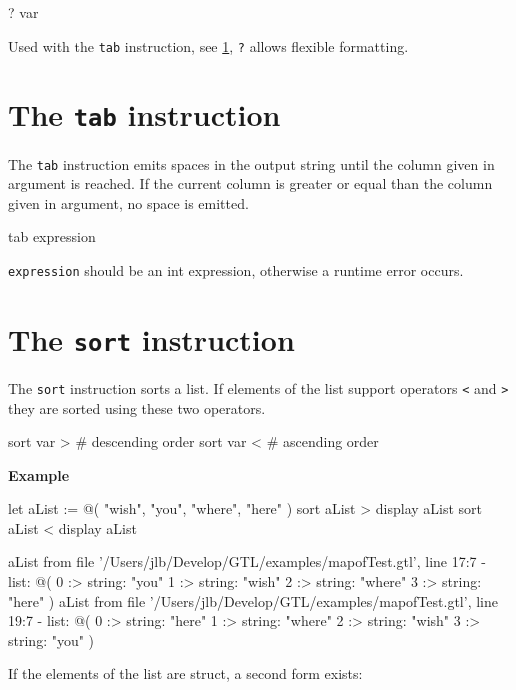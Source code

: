 \documentclass[10pt,openright,twosides]{report}
\newcommand{\gtltype}[1]{{\small\ttfamily #1}}
\newcommand{\gtlinline}[1]{\colorbox{light-blue}{\lstinline[language=gtl]{#1}}}
\newcommand{\example}{\vspace{.75em}\noindent\textbf{Example}\vspace{0em}}
\begin{document}
\begin{gtl}
? var
\end{gtl}

Used with the \gtlinline{tab} instruction, see \ref{sec:tab}, \gtlinline{?} allows flexible formatting.

\section{The \texttt{tab} instruction}
\label{sec:tab}

The \gtlinline{tab} instruction emits spaces in the output string until the column given in argument is reached. If the current column is greater or equal than the column given in argument, no space is emitted.

\begin{gtl}
tab expression
\end{gtl}

\gtlinline{expression} should be an \gtltype{int} expression, otherwise a runtime error occurs.

\section{The \texttt{sort} instruction}

The \gtlinline{sort} instruction sorts a \gtltype{list}. If elements of the list support operators \gtlinline{<} and \gtlinline{>} they are sorted using these two operators.

\begin{gtl}
sort var > # descending order
sort var < # ascending order
\end{gtl}

\example
\begin{gtl}
let aList := @( "wish", "you", "where", "here" )
sort aList >
display aList
sort aList <
display aList
\end{gtl}
\begin{console}
aList from file '/Users/jlb/Develop/GTL/examples/mapofTest.gtl', line 17:7
  - list: @(
    0 :>
        string: "you"
    1 :>
        string: "wish"
    2 :>
        string: "where"
    3 :>
        string: "here"
)
aList from file '/Users/jlb/Develop/GTL/examples/mapofTest.gtl', line 19:7
  - list: @(
    0 :>
        string: "here"
    1 :>
        string: "where"
    2 :>
        string: "wish"
    3 :>
        string: "you"
)
\end{console}

If the elements of the list are \gtltype{struct}, a second form exists:
\end{document}
